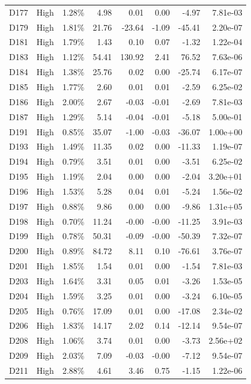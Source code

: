 \begin{tabular}{l l r r r r r r}
D177 & High & 1.28\% & 4.98 & 0.01 & 0.00 & -4.97 & 7.81e-03 \\
D179 & High & 1.81\% & 21.76 & -23.64 & -1.09 & -45.41 & 2.20e-07 \\
D181 & High & 1.79\% & 1.43 & 0.10 & 0.07 & -1.32 & 1.22e-04 \\
D183 & High & 1.12\% & 54.41 & 130.92 & 2.41 & 76.52 & 7.63e-06 \\
D184 & High & 1.38\% & 25.76 & 0.02 & 0.00 & -25.74 & 6.17e-07 \\
D185 & High & 1.77\% & 2.60 & 0.01 & 0.01 & -2.59 & 6.25e-02 \\
D186 & High & 2.00\% & 2.67 & -0.03 & -0.01 & -2.69 & 7.81e-03 \\
D187 & High & 1.29\% & 5.14 & -0.04 & -0.01 & -5.18 & 5.00e-01 \\
D191 & High & 0.85\% & 35.07 & -1.00 & -0.03 & -36.07 & 1.00e+00 \\
D193 & High & 1.49\% & 11.35 & 0.02 & 0.00 & -11.33 & 1.19e-07 \\
D194 & High & 0.79\% & 3.51 & 0.01 & 0.00 & -3.51 & 6.25e-02 \\
D195 & High & 1.19\% & 2.04 & 0.00 & 0.00 & -2.04 & 3.20e+01 \\
D196 & High & 1.53\% & 5.28 & 0.04 & 0.01 & -5.24 & 1.56e-02 \\
D197 & High & 0.88\% & 9.86 & 0.00 & 0.00 & -9.86 & 1.31e+05 \\
D198 & High & 0.70\% & 11.24 & -0.00 & -0.00 & -11.25 & 3.91e-03 \\
D199 & High & 0.78\% & 50.31 & -0.09 & -0.00 & -50.39 & 7.32e-07 \\
D200 & High & 0.89\% & 84.72 & 8.11 & 0.10 & -76.61 & 3.76e-07 \\
D201 & High & 1.85\% & 1.54 & 0.01 & 0.00 & -1.54 & 7.81e-03 \\
D203 & High & 1.64\% & 3.31 & 0.05 & 0.01 & -3.26 & 1.53e-05 \\
D204 & High & 1.59\% & 3.25 & 0.01 & 0.00 & -3.24 & 6.10e-05 \\
D205 & High & 0.76\% & 17.09 & 0.01 & 0.00 & -17.08 & 2.34e-02 \\
D206 & High & 1.83\% & 14.17 & 2.02 & 0.14 & -12.14 & 9.54e-07 \\
D208 & High & 1.06\% & 3.74 & 0.01 & 0.00 & -3.73 & 2.56e+02 \\
D209 & High & 2.03\% & 7.09 & -0.03 & -0.00 & -7.12 & 9.54e-07 \\
D211 & High & 2.88\% & 4.61 & 3.46 & 0.75 & -1.15 & 1.22e-06 \\

\end{tabular}
